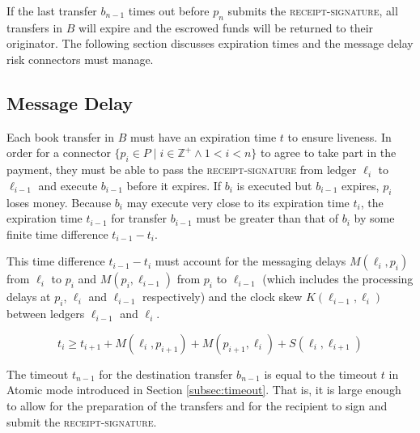 \documentclass[letterpaper,twocolumn,10pt]{article}
\begin{document}
If the last transfer $b_{n-1}$ times out before $p_n$ submits the \textsc{receipt-signature}, all transfers in $B$ will expire and the escrowed funds will be returned to their originator. The following section discusses expiration times and the message delay risk connectors must manage.


\subsection{Message Delay}
\label{subsec:message-delay}



Each book transfer in $B$ must have an expiration time $t$ to ensure liveness. In order for a connector $ \{ p_i \in P \mid i \in \mathbb{Z}^+ \land 1 < i < n \} $ to agree to take part in the payment, they must be able to pass the \textsc{receipt-signature} from ledger $\ell_i$ to $\ell_{i-1}$ and execute $b_{i-1}$ before it expires. If $b_i$ is executed but $b_{i-1}$ expires, $p_i$ loses money. Because $b_i$ may execute very close to its expiration time $t_i$, the expiration time $t_{i-1}$ for transfer $b_{i-1}$ must be greater than that of $b_i$ by some finite time difference $t_{i-1} - t_i$.

This time difference $t_{i-1} - t_i$ must account for the messaging delays $M(\ell_i, p_i)$ from $\ell_i$ to $p_i$ and $M(p_i, \ell_{i-1})$ from $p_i$ to $\ell_{i-1}$ (which includes the processing delays at $p_i$, $\ell_i$ and $\ell_{i-1}$ respectively) and the clock skew $K(\ell_{i-1}, \ell_i)$ between ledgers $\ell_{i-1}$ and $\ell_i$.

\begin{equation}
\label{eq:expiration-delta}
t_i \geq t_{i+1} + M(\ell_i, p_{i+1}) + M(p_{i+1}, \ell_i) + S(\ell_i, \ell_{i+1})
\end{equation}

The timeout $t_{n-1}$ for the destination transfer $b_{n-1}$ is equal to the timeout $t$ in Atomic mode introduced in Section \ref{subsec:timeout}. That is, it is large enough to allow for the preparation of the transfers and for the recipient to sign and submit the \textsc{receipt-signature}.



\end{document}
